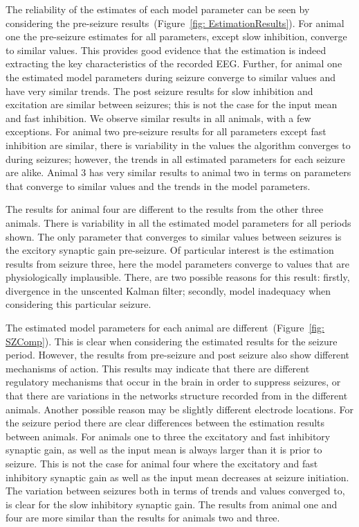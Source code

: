 The reliability of the estimates of each model parameter can be seen by considering the pre-seizure results~(Figure~\ref{fig: EstimationResults}). For animal one the pre-seizure estimates for all parameters, except slow inhibition, converge to similar values. This provides good evidence that the estimation is indeed extracting the key characteristics of the recorded EEG. Further, for animal one the estimated model parameters during seizure converge to similar values and have very similar trends. The post seizure results for slow inhibition and excitation are similar between seizures; this is not the case for the input mean and fast inhibition. We observe similar results in all animals, with a few exceptions. For animal two pre-seizure results for all parameters except fast inhibition are similar, there is variability in the values the algorithm converges to during seizures; however, the trends in all estimated parameters for each seizure are alike. Animal 3 has very similar results to animal two in terms on parameters that converge to similar values and the trends in the model parameters. 

The results for animal four are different to the results from the other three animals. There is variability in all the estimated model parameters for all periods shown. The only parameter that converges to similar values between seizures is the excitory synaptic gain pre-seizure. Of particular interest is the estimation results from seizure three, here the model parameters converge to values that are physiologically implausible. There, are two possible reasons for this result: firstly, divergence in the unscented Kalman filter; secondly, model inadequacy when considering this particular seizure. 

The estimated model parameters for each animal are different~(Figure~\ref{fig: SZComp}). This is clear when considering the estimated results for the seizure period. However, the results from pre-seizure and post seizure also show different mechanisms of action. This results may indicate that there are different regulatory mechanisms that occur in the brain in order to suppress seizures, or that there are variations in the networks structure recorded from in the different animals. Another possible reason may be slightly different electrode locations. For the seizure period there are clear differences between the estimation results between animals. For animals one to three the excitatory and fast inhibitory synaptic gain, as well as the input mean is always larger than it is prior to seizure. This is not the case for animal four where the excitatory and fast inhibitory synaptic gain as well as the input mean decreases at seizure initiation. The variation between seizures both in terms of trends and values converged to, is clear for the slow inhibitory synaptic gain. The results from animal one and four are more similar than the results for animals two and three. 

